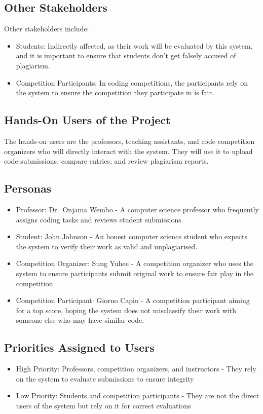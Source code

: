 \documentclass[12pt]{article}
\begin{document}
\subsection{Other Stakeholders}
Other stakeholders include:
\begin{itemize}
    \item Students: Indirectly affected, as their work will be evaluated by this
    system, and it is important to ensure that students don't get falsely accused
    of plagiarism.
    \item Competition Participants: In coding competitions, the participants
    rely on the system to ensure the competition they participate in is fair.
\end{itemize}

\subsection{Hands-On Users of the Project}
The hands-on users are the professors, teaching assistants, and code competition
organizers who will directly interact with the system. They will use it to
upload code submissions, compare entries, and review plagiarism reports.

\subsection{Personas}
\begin{itemize}
    \item Professor: Dr.\ Onjama Wembo - A computer science professor who
    frequently assigns coding tasks and reviews student submissions.
    \item Student: John Johnson - An honest computer science student who
    expects the system to verify their work as valid and unplagiarised.
    \item Competition Organizer: Sung Yuhee - A competition organizer who
    uses the system to ensure participants submit original work to ensure fair
    play in the competition.
    \item Competition Participant: Giorno Capio - A competition participant
    aiming for a top score, hoping the system does not
    misclassify their work with someone else who may have similar code.
\end{itemize}

\subsection{Priorities Assigned to Users}
\begin{itemize}
    \item High Priority: Professors, competition organizers, and instructors -
    They rely on the system to evaluate submissions to ensure integrity
    \item Low Priority: Students and competition participants - They are not the
    direct users of the system but rely on it for correct evaluations
\end{itemize}
\end{document}

